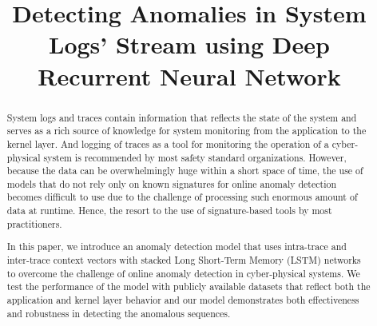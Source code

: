 \documentclass[conference]{IEEEtran}
\numberwithin{equation}{section}
\begin{document}
%
\title{Detecting Anomalies in System Logs' Stream using Deep 
Recurrent Neural Network}



\author{
}


\maketitle

\begin{abstract}
System logs and traces contain information that reflects the state of the 
system and serves as a rich source of knowledge for system monitoring from the 
application to the kernel layer. And logging of traces as a tool for monitoring 
the operation of a cyber-physical system is recommended by most safety standard 
organizations. However, because the data can be overwhelmingly huge within a 
short space of time, the use of models that do not rely only on known 
signatures for online anomaly detection becomes difficult to use due to the 
challenge of processing such enormous amount of data at runtime. Hence, the 
resort to the use of signature-based tools by most practitioners. \par
In this paper, we introduce an anomaly detection model that uses intra-trace 
and inter-trace context vectors with stacked Long Short-Term Memory (LSTM) 
networks to overcome the challenge of online anomaly detection in 
cyber-physical systems. We test the performance of the model with publicly 
available datasets that reflect both the application and kernel layer behavior 
and our model demonstrates both effectiveness and robustness in detecting the 
anomalous sequences.
\end{abstract}

\IEEEpeerreviewmaketitle



\end{document}
